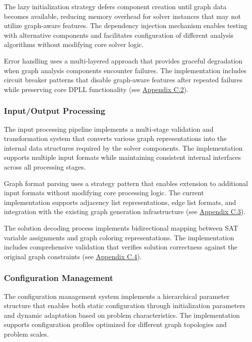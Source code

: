 The lazy initialization strategy defers component creation until graph data becomes available, reducing memory overhead for solver instances that may not utilize graph-aware features. The dependency injection mechanism enables testing with alternative components and facilitates configuration of different analysis algorithms without modifying core solver logic.

Error handling uses a multi-layered approach that provides graceful degradation when graph analysis components encounter failures. The implementation includes circuit breaker patterns that disable graph-aware features after repeated failures while preserving core DPLL functionality (see \hyperref[appendix:error-handling]{Appendix C.2}).

\subsubsection{Input/Output Processing}

The input processing pipeline implements a multi-stage validation and transformation system that converts various graph representations into the internal data structures required by the solver components. The implementation supports multiple input formats while maintaining consistent internal interfaces across all processing stages.

Graph format parsing uses a strategy pattern that enables extension to additional input formats without modifying core processing logic. The current implementation supports adjacency list representations, edge list formats, and integration with the existing graph generation infrastructure (see \hyperref[appendix:input-processing]{Appendix C.3}).

The solution decoding process implements bidirectional mapping between SAT variable assignments and graph coloring representations. The implementation includes comprehensive validation that verifies solution correctness against the original graph constraints (see \hyperref[appendix:solution-decoding]{Appendix C.4}).

\subsubsection{Configuration Management}

The configuration management system implements a hierarchical parameter structure that enables both static configuration through initialization parameters and dynamic adaptation based on problem characteristics. The implementation supports configuration profiles optimized for different graph topologies and problem scales.

